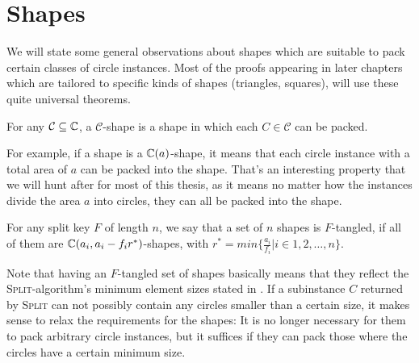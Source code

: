 \documentclass[%
    a4paper,              %
    style=screen,          %
    bibliography=totoc,   %
    nexus,                %
    lnum,                 %
    extramargin,          %
]{tubsbook}
\begin{document}
\section{Shapes}

We will state some general observations about shapes which are suitable to pack certain classes of circle instances. Most of the proofs appearing in later chapters which are tailored to specific kinds of shapes (triangles, squares), will use these quite universal theorems.

\begin{definition}
    For any $\mathcal{C} \subseteq \mathbb{C}$, a $\mathcal{C}$-shape is a shape in which each $C \in \mathcal{C}$ can be packed.
\end{definition}

For example, if a shape is a $\mathbb{C}(a)$-shape, it means that each circle instance with a total area of $a$ can be packed into the shape. That's an interesting property that we will hunt after for most of this thesis, as it means no matter how the instances divide the area $a$ into circles, they can all be packed into the shape.



\begin{definition}\label{def:tangled}
    For any split key $F$ of length $n$, we say that a set of $n$ shapes is $F$-tangled, if all of them are $\mathbb{C}(a_i, a_i - f_i r^*)$-shapes, with $r^* = min\{\frac{a_i}{f_i}|i \in 1,2,\dots,n\}$.
\end{definition}

Note that having an $F$-tangled set of shapes basically means that they reflect the \textsc{Split}-algorithm's minimum element sizes stated in . If a subinstance $C$ returned by \textsc{Split} can not possibly contain any circles smaller than a certain size, it makes sense to relax the requirements for the shapes: It is no longer necessary for them to pack arbitrary circle instances, but it suffices if they can pack those where the circles have a certain minimum size.
\end{document}
